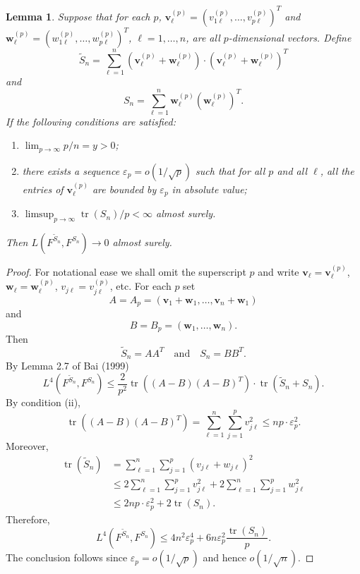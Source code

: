 \documentclass[a4paper,11pt]{article}
\theoremstyle{plain}
\newtheorem{lmm}[thm]{Lemma}
\theoremstyle{definition}
\newcommand{\tr}{\operatorname{tr}}
\begin{document}
    \begin{lmm} \label{lmm1}
    	Suppose that for each $p$, $\mathbf{v}_\ell^{(p)} = (v_{1\ell}^{(p)}, \dots, v_{p\ell}^{(p)})^T$ and $\mathbf{w}_\ell^{(p)} = (w_{1\ell}^{(p)}, \dots, w_{p\ell}^{(p)})^T$, $\ell = 1, \dots, n$, are all $p$-dimensional vectors. Define
    	\[	\widetilde{S}_n = \sum_{\ell = 1}^{n} (\mathbf{v}_\ell^{(p)} + \mathbf{w}_\ell^{(p)}) \cdot (\mathbf{v}_\ell^{(p)} + \mathbf{w}_\ell^{(p)})^T\]
    	and
    	\[S_n = \sum_{\ell = 1}^{n} \mathbf{w}_\ell^{(p)} (\mathbf{w}_\ell^{(p)})^T. \]
    	If the following conditions are satisfied:
    	\begin{enumerate}
    		\item $\lim_{p \rightarrow \infty} p/n = y > 0$;
    		\item there exists a sequence $\varepsilon_p = o(1/\sqrt{p})$ such that for all $p$ and all $\ell$, all the entries of $\mathbf{v}_\ell^{(p)}$ are bounded by $\varepsilon_p$ in absolute value;
    		\item $ \limsup_{p \rightarrow \infty} {\tr(S_n)}/{p} < \infty$ almost surely.
    	\end{enumerate}
    	Then $L(F^{\widetilde{S}_n}, F^{S_n}) \rightarrow 0$ almost surely.
    \end{lmm}
    \begin{proof}
    	For notational ease we shall omit the superscript $p$ and write $\mathbf{v}_\ell = \mathbf{v}_\ell^{(p)}$, $\mathbf{w}_\ell = \mathbf{w}_\ell^{(p)}$, $v_{j\ell} = v_{j\ell}^{(p)}$, etc. For each $p$ set 
    	\[ A = A_p = (\mathbf{v}_1 + \mathbf{w}_1, \dots, \mathbf{v}_n + \mathbf{w}_1) \]
    	and
    	\[ B = B_p = (\mathbf{w}_1, \dots,  \mathbf{w}_n). \]
    	Then
    	\[ \widetilde{S}_n = A A^T \quad \text{and} \quad S_n = BB^T. \]
    	By Lemma 2.7 of Bai (1999)
    	\[L^4(F^{\widetilde{S}_n}, F^{S_n}) \leq \frac{2}{p^2} \tr((A-B)(A-B)^T) \cdot \tr(\widetilde{S}_n + S_n). \]
    	By condition (ii),
    	\[ \tr((A-B)(A-B)^T)  = \sum_{\ell=1}^{n} \sum_{j=1}^{p} v_{j\ell}^2 \leq np \cdot \varepsilon_p^2. \]
    	Moreover,
    	\[
    	\begin{aligned}
    	\tr(\widetilde{S}_n) &= \sum_{\ell=1}^{n} \sum_{j=1}^{p} (v_{j\ell} + w_{j\ell})^2 \\
    	& \leq 2 \sum_{\ell=1}^{n} \sum_{j=1}^{p} v_{j\ell}^2 + 2\sum_{\ell=1}^{n} \sum_{j=1}^{p} w_{j\ell}^2 \\
    	& \leq 2np \cdot \varepsilon_p^2 + 2 \tr(S_n).
    	\end{aligned}
    	 \]
    	 Therefore,
    	 \[L^4(F^{\widetilde{S}_n}, F^{S_n}) \leq 4n^2\varepsilon_p^4 + 6n\varepsilon_p^2 \frac{\tr(S_n)}{p}. \]
    	 The conclusion follows since $\varepsilon_p = o(1/\sqrt{p})$ and hence $o(1/\sqrt{n})$.
    \end{proof}
    
\end{document}

